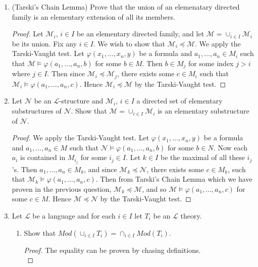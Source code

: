 \documentclass{article}
\begin{document}
\begin{enumerate}
  \item (Tarski's Chain Lemma) Prove that the union of an elemenatary
    directed family is an elementary extension of all its members.
    \begin{proof}
      Let $\mathcal{M}_i$, $i\in I$ be an elementary directed family, and
      let $\mathcal{M}=\cup_{i\in I}\mathcal{M}_i$ be its union. Fix any
      $i\in I$. We wish to show that $\mathcal{M}_i\preceq\mathcal{M}$. We
      apply the Tarski-Vaught test. Let $\varphi(x_1,\ldots,x_n,y)$ be a
      formula and $a_1,\ldots,a_n\in M_i$ such that
      $\mathcal{M}\models\varphi(a_1,\ldots,a_n,b)$ for some $b\in M$. Then
      $b\in M_j$ for some index $j>i$ where $j\in I$. Then since
      $\mathcal{M}_i\preceq\mathcal{M}_j$, there exists some $c\in M_i$
      such that $\mathcal{M}_i\models\varphi(a_1,\ldots,a_n,c)$. Hence
      $\mathcal{M}_i\preceq\mathcal{M}$ by the Tarski-Vaught test.
    \end{proof}

  \item Let $\mathcal{N}$ be an $\mathcal{L}$-structure and
    $\mathcal{M}_i$, $i\in I$ a directed set of elementary substructures of
    $\mathcal{N}$. Show that $\mathcal{M}=\cup_{i\in I}\mathcal{M}_i$ is an
    elementary substructure of $\mathcal{N}$.

    \begin{proof}
      We apply the Tarski-Vaught test. Let $\varphi(x_1,\ldots,x_n,y)$ be a
      formula and $a_1,\ldots,a_n\in M$ such that
      $\mathcal{N}\models\varphi(a_1,\ldots,a_n,b)$ for some $b\in N$. Now
      each $a_i$ is contained in $M_{i_j}$ for some $i_j\in I$. Let $k\in
      I$ be the maximal of all these $i_j$'s. Then $a_1,\ldots,a_n\in M_k$,
      and since $\mathcal{M}_k\preceq\mathcal{N}$, there exists some $c\in
      M_k$, such that $\mathcal{M}_k\models\varphi(a_1,\ldots,a_n,c)$. Then
      from Tarski's Chain Lemma which we have proven in the previous
      question, $\mathcal{M}_k\preceq\mathcal{M}$, and so
      $\mathcal{M}\models\varphi(a_1,\ldots,a_n,c)$ for some $c\in M$. Hence
      $\mathcal{M}\preceq\mathcal{N}$ by the Tarski-Vaught test.
    \end{proof}

  \item Let $\mathcal{L}$ be a language and for each $i\in I$ let $T_i$ be
    an $\mathcal{L}$ theory.
    \begin{enumerate}
      \item Show that $Mod(\cup_{i\in I}T_i)=\cap_{i\in I}Mod(T_i)$.
        \begin{proof}
          The equality can be proven by chasing definitions. \\


\end{proof}
\end{enumerate}
\end{enumerate}
\end{document}

